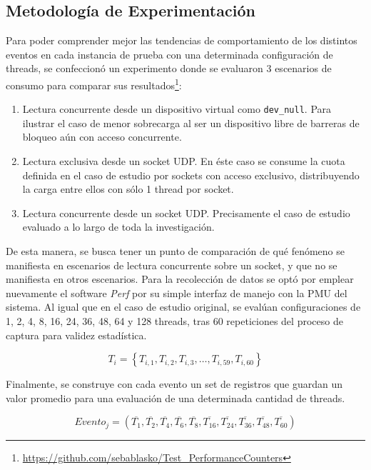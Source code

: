 \subsection{Metodología de Experimentación}
Para poder comprender mejor las tendencias de comportamiento de los distintos eventos en cada instancia de prueba con una determinada configuración de threads, se confeccionó un experimento donde se evaluaron 3 escenarios de consumo para comparar sus resultados\footnote{\url{https://github.com/sebablasko/Test_PerformanceCounters}}:

\begin{enumerate}
\item Lectura concurrente desde un dispositivo virtual como \verb=dev_null=. Para ilustrar el caso de menor sobrecarga al ser un dispositivo libre de barreras de bloqueo aún con acceso concurrente.
\item Lectura exclusiva desde un socket UDP. En éste caso se consume la cuota definida en el caso de estudio por sockets con acceso exclusivo, distribuyendo la carga entre ellos con sólo 1 thread por socket. 
\item Lectura concurrente desde un socket UDP. Precisamente el caso de estudio evaluado a lo largo de toda la investigación.
\end{enumerate}

De esta manera, se busca tener un punto de comparación de qué fenómeno se manifiesta en escenarios de lectura concurrente sobre un socket, y que no se manifiesta en otros escenarios. Para la recolección de datos se optó por emplear nuevamente el software \emph{Perf} por su simple interfaz de manejo con la PMU del sistema. Al igual que en el caso de estudio original, se evalúan configuraciones de 1, 2, 4, 8, 16, 24, 36, 48, 64 y 128 threads, tras 60 repeticiones del proceso de captura para validez estadística. 

\begin{equation}
T_i = \left\{ T_{i,1},T_{i,2},T_{i,3}, \dots ,T_{i,59}, T_{i,60}\right\} 
\end{equation}

Finalmente, se construye con cada evento un set de registros que guardan un valor promedio para una evaluación de una determinada cantidad de threads.

\begin{equation}
Evento_j = \left(\overline{T_{1}}, \overline{T_{2}}, \overline{T_{4}}, \overline{T_{6}}, \overline{T_{8}}, \overline{T_{16}}, \overline{T_{24}}, \overline{T_{36}}, \overline{T_{48}}, \overline{T_{60}}\right)
\end{equation}

